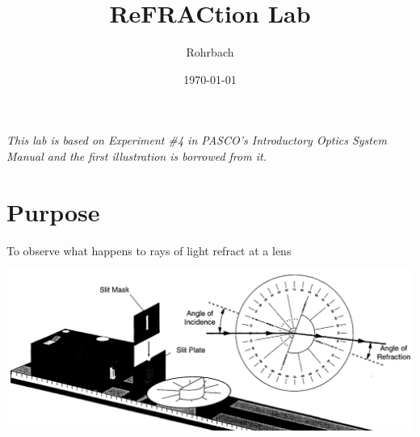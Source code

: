 \documentclass[10pt]{exam}
\title{ReFRACtion Lab}
\author{Rohrbach}
\date{\today}
\begin{document}
\maketitle

\noindent
{\small \it This lab is based on Experiment \#4 in PASCO's Introductory Optics System Manual and the first illustration is borrowed from it.}

\section*{Purpose} To observe what happens to rays of light refract at a lens

\includegraphics[width=15cm]{Fig4_1.png}

\vspace{-1em}
\end{document}

